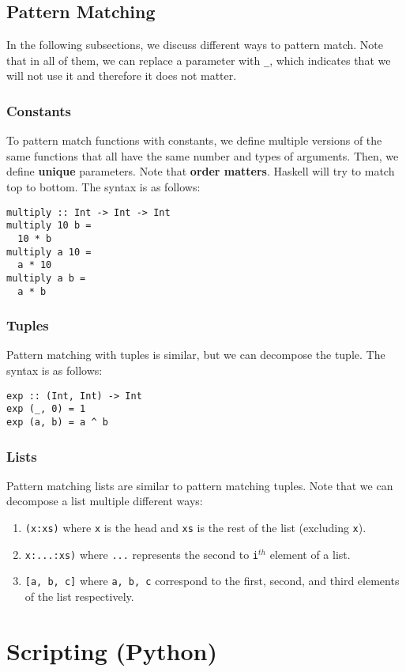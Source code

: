 \documentclass{article}
\begin{document}
\subsection{Pattern Matching}
In the following subsections, we discuss different ways to pattern
match. Note that in all of them, we can replace a parameter 
with \texttt{\_}, which indicates that we will not use it and
therefore it does not matter.

\subsubsection{Constants}
To pattern match functions with constants, we define multiple versions
of the same functions that all have the same number and types of
arguments. Then, we define \textbf{unique} parameters. Note that
\textbf{order matters}. Haskell will try to match top to
bottom. The syntax is as follows:
\begin{verbatim}
multiply :: Int -> Int -> Int
multiply 10 b =
  10 * b
multiply a 10 =
  a * 10
multiply a b =
  a * b
\end{verbatim}

\subsubsection{Tuples}
Pattern matching with tuples is similar, but we can decompose the
tuple. The syntax is as follows: 
\begin{verbatim}
exp :: (Int, Int) -> Int
exp (_, 0) = 1
exp (a, b) = a ^ b
\end{verbatim}

\subsubsection{Lists}
Pattern matching lists are similar to pattern matching tuples. Note
that we can decompose a list multiple different ways:
\begin{enumerate}[label=(\roman*),align=left]
\item \texttt{(x:xs)} where \texttt{x} is the head and \texttt{xs} is
  the rest of the list (excluding \texttt{x}).
\item \texttt{x:...:xs)} where \texttt{...} represents the second to
  \texttt{i$^{th}$} element of a list.
\item \texttt{[a, b, c]} where \texttt{a, b, c} correspond to the
  first, second, and third elements of the list respectively.
\end{enumerate}





\section{Scripting (Python)}
\end{document}
